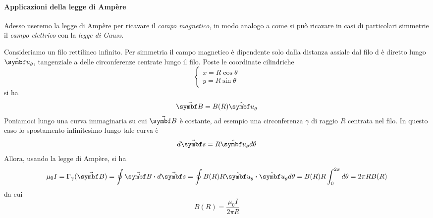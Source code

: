 \paragraph{Applicazioni della legge di Ampère}
Adesso useremo la legge di Ampère per ricavare il \textit{campo magnetico}, in modo analogo a come si può ricavare in casi di particolari simmetrie il \textit{campo elettrico} con la \textit{legge di Gauss}.
\begin{examplewt}
	Consideriamo un filo rettilineo infinito. Per simmetria il campo magnetico è dipendente solo dalla distanza assiale dal filo d è diretto lungo $\vbh{u}_\theta$, tangenziale a delle circonferenze centrate lungo il filo. Poste le coordinate cilindriche
	\begin{equation*}
		\begin{cases}
			x=R\cos\theta\\
			y=R\sin\theta
		\end{cases}
	\end{equation*}
	si ha
	\begin{equation*}
		\vba{B}=B(R)\vbh{u}_\theta
	\end{equation*}
	Poniamoci lungo una curva immaginaria su cui $\vba{B}$ è costante, ad esempio una circonferenza $\gamma$ di raggio $R$ centrata nel filo. In questo caso lo spostamento infinitesimo lungo tale curva è
	\begin{equation*}
		d\vba{s}=R\vbh{u}_\theta d\theta
	\end{equation*}
	Allora, usando la legge di Ampère, si ha
	\begin{equation*}
		\mu_0I=\Gamma_{\gamma}(\vba{B})=\oint\vba{B}\vdot d\vba{s}=\oint B(R)R\vbh{u}_\theta\vdot\vbh{u}_{\theta}d\theta=B(R)R\int_{0}^{2\pi}d\theta=2\pi R B(R)
	\end{equation*}
	da cui
	\begin{equation}
		B(R)=\frac{\mu_0 I}{2\pi R}
	\end{equation}
\end{examplewt}

